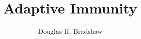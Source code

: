 \documentclass[letterpaper,twoside,12pt]{scrbook}
\begin{document}
\title{Adaptive Immunity}
\author{Douglas H. Bradshaw}
\frontmatter
\maketitle
\tableofcontents
\mainmatter

\end{document}
